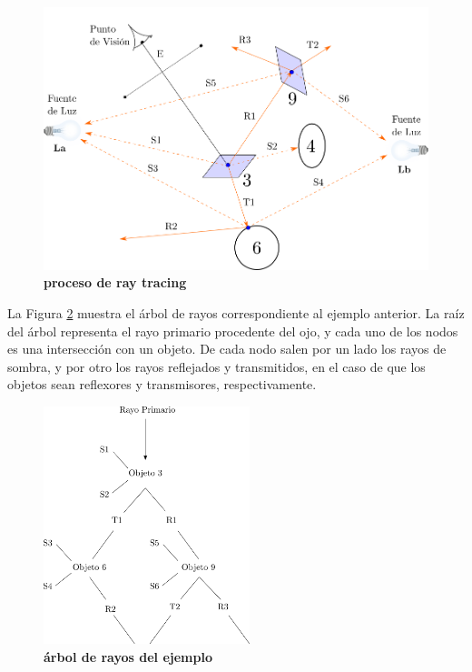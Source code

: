 \begin{figure}[h]
    \includegraphics[width=12cm]{Img/CPD/grafica13.png}
    \centering
    \caption{\textbf{\footnotesize{   proceso de ray tracing   }}}
    \label{fig:grafica13}
\end{figure}

La Figura \ref{fig:grafica14} muestra el árbol de rayos correspondiente al ejemplo anterior.
La raíz del árbol representa el rayo primario procedente del ojo, y cada uno de los nodos es una intersección con un objeto. De cada nodo salen por un lado los rayos de sombra, y por otro los rayos reflejados y transmitidos, en el caso de que los objetos sean reflexores y transmisores, respectivamente.

\begin{figure}[h]
    \includegraphics[width=6cm]{Img/CPD/grafica14.png}
    \centering
    \caption{\textbf{\footnotesize{   árbol de rayos del ejemplo }}}
    \label{fig:grafica14}
\end{figure}

